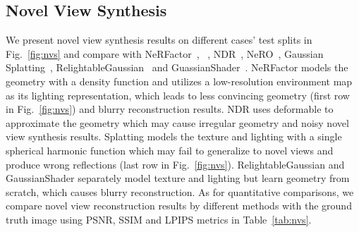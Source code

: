 \subsection{Novel View Synthesis}
We present novel view synthesis results on different cases' test splits in Fig.~\ref{fig:nvs} and compare  with NeRFactor~\cite{NeRFactor}, ~\cite{TensoIR}, NDR~\cite{NvDiffRec}, NeRO~\cite{NeRO}, Gaussian Splatting~\cite{GS}, RelightableGaussian~\cite{RelightableGaussian} and GuassianShader~\cite{GaussianShader}. 
NeRFactor models the geometry with a density function and utilizes a low-resolution environment map as its lighting representation, which leads to less convincing geometry (first row in Fig.~\ref{fig:nvs}) and blurry reconstruction results. 
NDR uses deformable  to approximate the geometry which may cause irregular geometry and noisy novel view synthesis results. 
 Splatting models the texture and lighting with a single spherical harmonic function which may fail to generalize to novel views and produce wrong reflections (last row in Fig.~\ref{fig:nvs}). 
RelightableGaussian and GaussianShader separately model texture and lighting but learn geometry from scratch, which causes blurry reconstruction. 
As for quantitative comparisons, we compare novel view reconstruction results by different methods with the ground truth image using PSNR, SSIM and LPIPS metrics in Table~\ref{tab:nvs}. 








